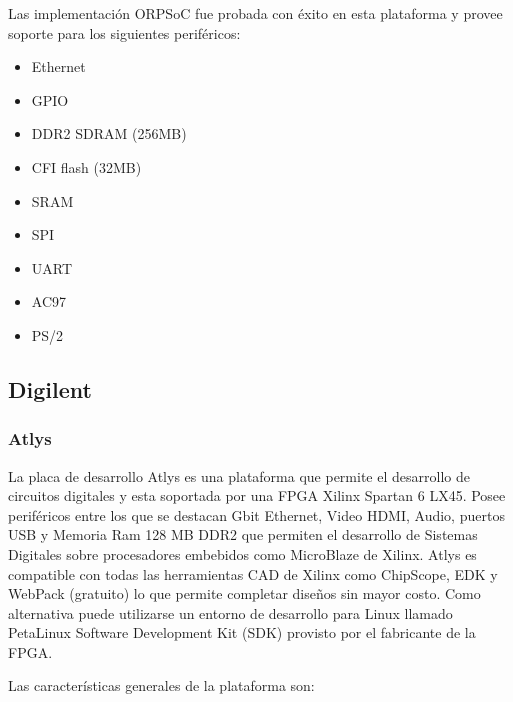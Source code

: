 				Las implementación ORPSoC fue probada con éxito en esta plataforma y provee soporte para los siguientes periféricos:
				
				\begin{itemize}
				  \item Ethernet
				  \item GPIO
				  \item DDR2 SDRAM (256MB)
				  \item CFI flash (32MB)
				  \item SRAM
				  \item SPI
				  \item UART
				  \item AC97 
				  \item PS/2 				
				\end{itemize}
			
				
				\subsection{Digilent}
				\subsubsection{Atlys}
				La placa de desarrollo Atlys es una plataforma que permite el desarrollo de circuitos digitales y esta soportada por una FPGA Xilinx Spartan 6 LX45. Posee periféricos entre los que se destacan Gbit Ethernet, Video HDMI, Audio, puertos USB y Memoria Ram 128 MB DDR2 que permiten el
				desarrollo de Sistemas Digitales sobre procesadores embebidos como  MicroBlaze de Xilinx. Atlys es compatible con todas las herramientas CAD de
				Xilinx como ChipScope, EDK y WebPack (gratuito) lo que permite completar diseños sin mayor costo. Como alternativa puede utilizarse un entorno de
				desarrollo para Linux llamado PetaLinux Software Development Kit (SDK) provisto por el fabricante de la FPGA.
				
				Las características generales de la plataforma son:
				

